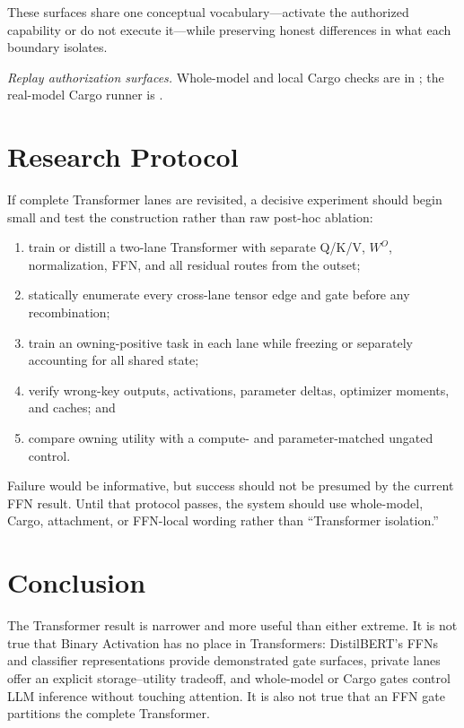 \documentclass[11pt]{article}
\begin{document}
These surfaces share one conceptual vocabulary---activate the authorized
capability or do not execute it---while preserving honest differences in what
each boundary isolates.

\noindent\textit{Replay authorization surfaces.} Whole-model and local Cargo
checks are in ; the
real-model Cargo runner is
.

\section{Research Protocol}

If complete Transformer lanes are revisited, a decisive experiment should
begin small and test the construction rather than raw post-hoc ablation:
\begin{enumerate}
  \item train or distill a two-lane Transformer with separate Q/K/V, $W^O$,
  normalization, FFN, and all residual routes from the outset;
  \item statically enumerate every cross-lane tensor edge and gate before any
  recombination;
  \item train an owning-positive task in each lane while freezing or separately
  accounting for all shared state;
  \item verify wrong-key outputs, activations, parameter deltas, optimizer
  moments, and caches; and
  \item compare owning utility with a compute- and parameter-matched ungated
  control.
\end{enumerate}
Failure would be informative, but success should not be presumed by the current
FFN result. Until that protocol passes, the system should use whole-model,
Cargo, attachment, or FFN-local wording rather than ``Transformer isolation.''

\section{Conclusion}

The Transformer result is narrower and more useful than either extreme. It is
not true that Binary Activation has no place in Transformers: DistilBERT's FFNs
and classifier representations provide demonstrated gate surfaces, private
lanes offer an explicit
storage--utility tradeoff, and whole-model or Cargo gates control LLM inference
without touching attention. It is also not true that an FFN gate partitions the
complete Transformer.
\end{document}
